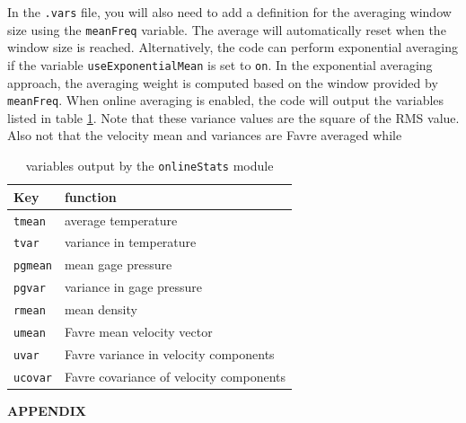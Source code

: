 \documentclass{article}
\begin{document}
In the {\tt .vars} file, you will also need to add a definition for
the averaging window size using the {\tt meanFreq} variable.  The
average will automatically reset when the window size is reached.
Alternatively, the code can perform exponential averaging if the
variable {\tt useExponentialMean} is set to {\tt on}.  In the
exponential averaging approach, the averaging weight is computed based
on the window provided by {\tt meanFreq}.  When online averaging is
enabled, the code will output the variables listed in table
\ref{tab:onlinestats}.  Note that these variance values are the square
of the RMS value.  Also not that the velocity mean and variances are
Favre averaged while

\begin{table}[htbp]
  \begin{center}
    
    \leavevmode
    \begin{tabular}{|l|l|}
      \hline
      Key & function \\
      \hline
      {\tt tmean} & average temperature \\
      {\tt tvar} & variance in temperature \\
      {\tt pgmean} & mean gage pressure \\
      {\tt pgvar} & variance in gage pressure\\
      {\tt rmean} & mean density\\
      {\tt umean} & Favre mean velocity vector\\
      {\tt uvar} & Favre variance in velocity components\\
      {\tt ucovar} & Favre covariance of velocity components\\
      \hline
    \end{tabular}
    
    \caption{variables output by the {\tt onlineStats} module}
    \label{tab:onlinestats}
  \end{center}
\end{table}


\clearpage
\appendix
\def\V{\mathcal{V}}
\def\A{\mathcal{A}}

\begin{center}
{\huge \bf APPENDIX}
\end{center}







\end{document}
